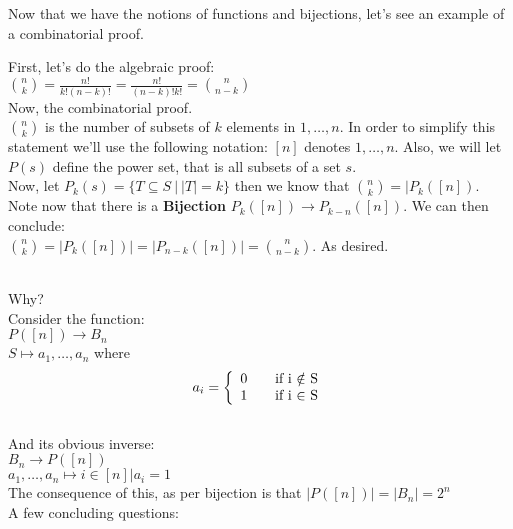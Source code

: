 \documentclass[12pt, twoside, exarticle]{article}
\begin{document}
 Now that we have the notions of functions and bijections, let's see an example of a combinatorial proof. \\


First, let's do the algebraic proof: \\

$\binom{n}{k} = \frac{n!}{k!(n-k)!} = \frac{n!}{(n-k)! k!} = \binom{n}{n-k}$ \\

Now, the combinatorial proof. \\

$\binom{n}{k}$ is the number of subsets of $k$ elements in ${1, \dots, n}$.  In order to simplify this statement we'll use the following notation: $[n]$ denotes ${1, \dots, n}$.  Also, we will let $P(s)$ define the power set, that is all subsets of a set $s$. \\

Now, let $P_k(s) = \{T \subseteq S \: | \: |T| = k\}$ then we know that $\binom{n}{k} = | P_k([n])$. \\

Note now that there is a \textbf{Bijection} $P_k([n]) \to P_{k-n}([n])$. We can then conclude:\\

$\binom{n}{k} = |P_k([n])| = |P_{n-k}([n])| = \binom{n}{n-k}$. As desired. \\ \\


Why? \\

Consider the function:\\
$P([n]) \to B_n$ \\
$S \mapsto a_1,\dots,a_n$ where \\ 
\[ a_i = \left\{ 
  \begin{array}{l l}
    0 & \quad \text{if i $\notin$ S}\\
    1 & \quad \text{if i $\in$ S}
  \end{array} \right.\] \\

And its obvious inverse: \\
$B_n \to P([n])$ \\
$ a_1,\dots,a_n\mapsto {i\in [n] | a_i = 1}$ \\

The consequence of this, as per bijection is that $|P([n])| = |B_n| = 2^n$ \\

A few concluding questions: \\



\end{document}
